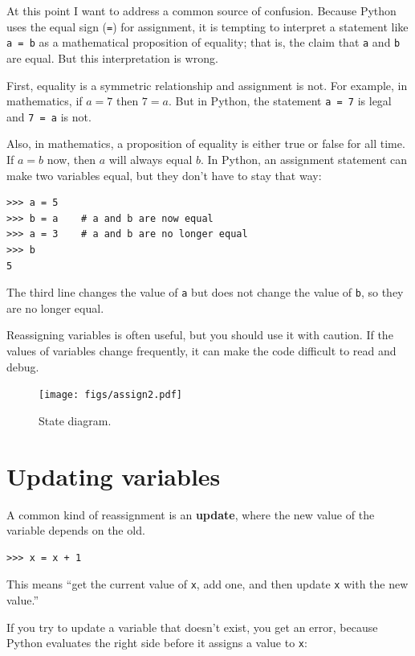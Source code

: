\documentclass[10pt]{book}
\begin{document}
At this point I want to address a common source of
confusion.
Because Python uses the equal sign ({\tt =}) for assignment, it is
tempting to interpret a statement like {\tt a = b} as a
mathematical
proposition of equality; that is, the claim that {\tt a} and
{\tt b} are equal.  But this interpretation is wrong.

First, equality is a symmetric relationship and assignment is not.  For
example, in mathematics, if $a=7$ then $7=a$.  But in Python, the
statement {\tt a = 7} is legal and {\tt 7 = a} is not.

Also, in mathematics, a proposition of equality is either true or
false for all time.  If $a=b$ now, then $a$ will always equal $b$.
In Python, an assignment statement can make two variables equal, but
they don't have to stay that way:

\begin{verbatim}
>>> a = 5
>>> b = a    # a and b are now equal
>>> a = 3    # a and b are no longer equal
>>> b
5
\end{verbatim}
%
The third line changes the value of {\tt a} but does not change the
value of {\tt b}, so they are no longer equal.

Reassigning variables is often useful, but you should use it
with caution.  If the values of variables change frequently, it can
make the code difficult to read and debug.

\begin{figure}
\centerline
{\texttt{[image: figs/assign2.pdf]}}
\caption{State diagram.}
\label{fig.assign2}
\end{figure}



\section{Updating variables}
\label{update}


A common kind of reassignment is an {\bf update},
where the new value of the variable depends on the old.

\begin{verbatim}
>>> x = x + 1
\end{verbatim}
%
This means ``get the current value of {\tt x}, add one, and then
update {\tt x} with the new value.''

If you try to update a variable that doesn't exist, you get an
error, because Python evaluates the right side before it assigns
a value to {\tt x}:
\end{document}
